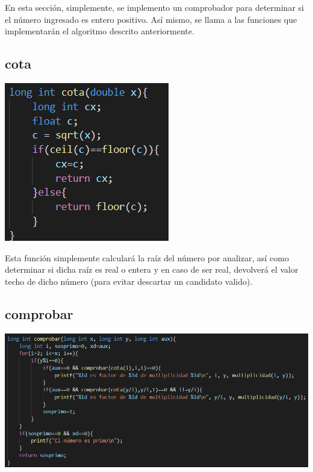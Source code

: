 \documentclass[12pt]{article}
\begin{document}
En esta secci\'on, simplemente, se implemento un comprobador para determinar si el n\'umero ingresado es entero positivo. Así mismo, se llama a las funciones que implementar\'an el algoritmo descrito anteriormente.

\subsection{cota}
\begin{center}
 \includegraphics[scale=1]{cota}
\end{center}

Esta funci\'on simplemente calcular\'a la ra\'{i}z del n\'umero por analizar, as\'{i} como determinar si dicha ra\'{i}z es real o entera y en caso de ser real, devolver\'a el valor techo de dicho n\'umero (para evitar descartar un candidato valido).

\subsection{comprobar}
\begin{center}
 \includegraphics[scale=0.7]{comprobar}
\end{center}
\end{document}
